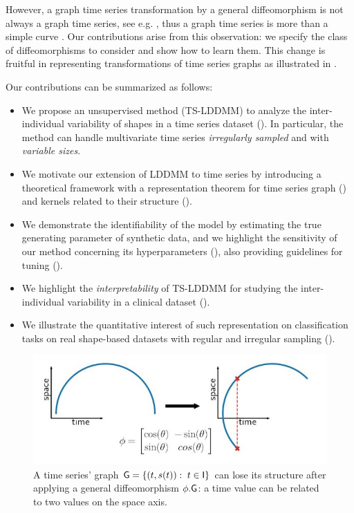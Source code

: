      
However, a graph time series transformation by a general diffeomorphism is not always a graph time series, see e.g. , thus a graph time series is more than a simple curve \cite{glaunes2008large}. Our contributions arise from this observation: we specify the class of diffeomorphisms to consider and show how to learn them. This change is fruitful in representing transformations of time series graphs as illustrated in .

Our contributions can be summarized as follows:
\begin{itemize}
  \item We propose an unsupervised method (TS-LDDMM) to analyze the inter-individual variability of shapes in a time series dataset (). In particular, the method can handle multivariate time series \textit{irregularly sampled} and with \textit{variable sizes}.
  
  \item We motivate our extension of LDDMM to time series by introducing a theoretical framework with a representation theorem for time series graph () and kernels related to their structure ().
  
  \item We demonstrate the identifiability of the model by estimating the true generating parameter of synthetic data, and we highlight the sensitivity of our method concerning its hyperparameters (), also providing guidelines for tuning ().
  
  \item We highlight the \textit{interpretability} of TS-LDDMM for studying the inter-individual variability in a clinical dataset ().
  
  \item We illustrate the quantitative interest of such representation on classification tasks on real shape-based datasets with regular and irregular sampling ().
\end{itemize}

\begin{figure}[t]
  \centering
  \includegraphics[width=0.7\linewidth]{"./pictures/diffeo.jpeg"}
  \caption{A time series' graph $\mathsf{G}=\{(t,s(t)): \; t\in\mathsf{I}\} $ can lose its structure after applying a general diffeomorphism $\phi.\mathsf{G}$: a time value can be related to two values on the space axis.}
  \label{fig:diffeo}
\end{figure}

